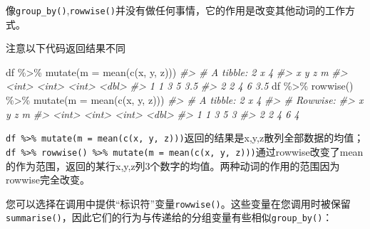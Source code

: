 \documentclass[
]{book}
\newenvironment{Shaded}{\begin{snugshade}}{\end{snugshade}}
\newcommand{\AttributeTok}[1]{\textcolor[rgb]{0.77,0.63,0.00}{#1}}
\newcommand{\CommentTok}[1]{\textcolor[rgb]{0.56,0.35,0.01}{\textit{#1}}}
\newcommand{\FunctionTok}[1]{\textcolor[rgb]{0.00,0.00,0.00}{#1}}
\newcommand{\NormalTok}[1]{#1}
\newcommand{\SpecialCharTok}[1]{\textcolor[rgb]{0.00,0.00,0.00}{#1}}
\begin{document}
像\texttt{group\_by()},\texttt{rowwise()}并没有做任何事情，它的作用是改变其他动词的工作方式。

注意以下代码返回结果不同

\begin{Shaded}
\begin{Highlighting}[]
\NormalTok{df }\SpecialCharTok{\%\textgreater{}\%} \FunctionTok{mutate}\NormalTok{(}\AttributeTok{m =} \FunctionTok{mean}\NormalTok{(}\FunctionTok{c}\NormalTok{(x, y, z)))}
\CommentTok{\#\textgreater{} \# A tibble: 2 x 4}
\CommentTok{\#\textgreater{}       x     y     z     m}
\CommentTok{\#\textgreater{}   \textless{}int\textgreater{} \textless{}int\textgreater{} \textless{}int\textgreater{} \textless{}dbl\textgreater{}}
\CommentTok{\#\textgreater{} 1     1     3     5   3.5}
\CommentTok{\#\textgreater{} 2     2     4     6   3.5}
\NormalTok{df }\SpecialCharTok{\%\textgreater{}\%} \FunctionTok{rowwise}\NormalTok{() }\SpecialCharTok{\%\textgreater{}\%} \FunctionTok{mutate}\NormalTok{(}\AttributeTok{m =} \FunctionTok{mean}\NormalTok{(}\FunctionTok{c}\NormalTok{(x, y, z)))}
\CommentTok{\#\textgreater{} \# A tibble: 2 x 4}
\CommentTok{\#\textgreater{} \# Rowwise: }
\CommentTok{\#\textgreater{}       x     y     z     m}
\CommentTok{\#\textgreater{}   \textless{}int\textgreater{} \textless{}int\textgreater{} \textless{}int\textgreater{} \textless{}dbl\textgreater{}}
\CommentTok{\#\textgreater{} 1     1     3     5     3}
\CommentTok{\#\textgreater{} 2     2     4     6     4}
\end{Highlighting}
\end{Shaded}

\texttt{df\ \%\textgreater{}\%\ mutate(m\ =\ mean(c(x,\ y,\ z)))}返回的结果是x,y,z散列全部数据的均值；\texttt{df\ \%\textgreater{}\%\ rowwise()\ \%\textgreater{}\%\ mutate(m\ =\ mean(c(x,\ y,\ z)))}通过rowwise改变了mean的作为范围，返回的某行x,y,z列3个数字的均值。两种动词的作用的范围因为rowwise完全改变。

您可以选择在调用中提供``标识符''变量\texttt{rowwise()}。这些变量在您调用时被保留\texttt{summarise()}，因此它们的行为与传递给的分组变量有些相似\texttt{group\_by()}：
\end{document}

